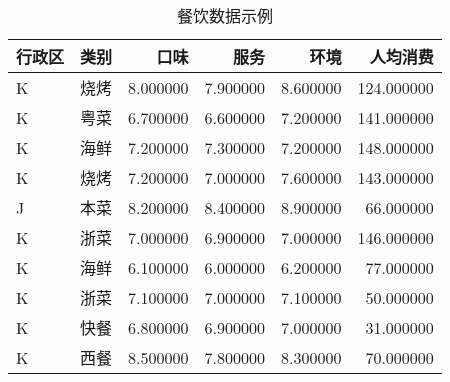 \begin{table}
\caption{餐饮数据示例}
\label{tab:sample_data}
\begin{tabular}{llrrrr}
\toprule
行政区 & 类别 & 口味 & 服务 & 环境 & 人均消费 \\
\midrule
K & 烧烤 & 8.000000 & 7.900000 & 8.600000 & 124.000000 \\
K & 粤菜 & 6.700000 & 6.600000 & 7.200000 & 141.000000 \\
K & 海鲜 & 7.200000 & 7.300000 & 7.200000 & 148.000000 \\
K & 烧烤 & 7.200000 & 7.000000 & 7.600000 & 143.000000 \\
J & 本菜 & 8.200000 & 8.400000 & 8.900000 & 66.000000 \\
K & 浙菜 & 7.000000 & 6.900000 & 7.000000 & 146.000000 \\
K & 海鲜 & 6.100000 & 6.000000 & 6.200000 & 77.000000 \\
K & 浙菜 & 7.100000 & 7.000000 & 7.100000 & 50.000000 \\
K & 快餐 & 6.800000 & 6.900000 & 7.000000 & 31.000000 \\
K & 西餐 & 8.500000 & 7.800000 & 8.300000 & 70.000000 \\
\bottomrule
\end{tabular}
\end{table}
